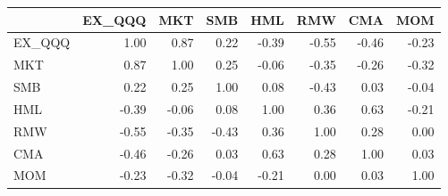 \begin{tabular}{lrrrrrrr}
\toprule
 & EX\_QQQ & MKT & SMB & HML & RMW & CMA & MOM \\
\midrule
EX\_QQQ & 1.00 & 0.87 & 0.22 & -0.39 & -0.55 & -0.46 & -0.23 \\
MKT & 0.87 & 1.00 & 0.25 & -0.06 & -0.35 & -0.26 & -0.32 \\
SMB & 0.22 & 0.25 & 1.00 & 0.08 & -0.43 & 0.03 & -0.04 \\
HML & -0.39 & -0.06 & 0.08 & 1.00 & 0.36 & 0.63 & -0.21 \\
RMW & -0.55 & -0.35 & -0.43 & 0.36 & 1.00 & 0.28 & 0.00 \\
CMA & -0.46 & -0.26 & 0.03 & 0.63 & 0.28 & 1.00 & 0.03 \\
MOM & -0.23 & -0.32 & -0.04 & -0.21 & 0.00 & 0.03 & 1.00 \\
\bottomrule
\end{tabular}
